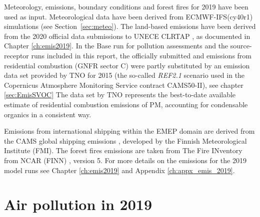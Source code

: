  Meteorology, emissions, boundary conditions and forest fires for 2019 have been
 used as input. Meteorological data have been
 derived from ECMWF-IFS(cy40r1) simulations (see Section~\ref{sec:meteo}). The
 land-based emissions have been derived from the 2020 official data
 submissions to UNECE CLRTAP \citep{CEIP2020}, as documented in
 Chapter \ref{ch:emis2019}. In the Base run for pollution assessments and the source-receptor runs included in this report, the officially submitted \PM[10] and \PM[2.5] emissions from residential combustion (GNFR sector C) were partly substituted by an emission data set provided by TNO for 2015 (the so-called \textit{REF2.1} scenario used in the Copernicus Atmosphere Monitoring Service contract CAMS50-II), see chapter \ref{sec:EmisSVOC} The data set by TNO represents the best-to-date available estimate of residential combustion emissions of PM, accounting for condensable organics in a consistent way. 
 
 Emissions from international shipping
 within the EMEP domain are derived from the CAMS global shipping
 emissions \citep{CAMSemis2019}, developed by the Finnish
 Meteorological Institute (FMI). The forest fires emissions are taken from
 The Fire INventory from NCAR (FINN) \citep{FINNIGAN1990}, version 5.
 For more details on the emissions for the 2019 model runs see Chapter
 \ref{ch:emis2019} and Appendix \ref{ch:appx_emis_2019}.


\section{Air pollution in 2019} 
